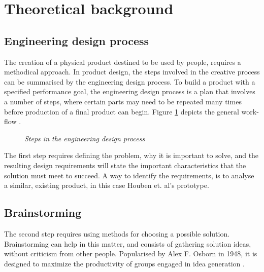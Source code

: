 \section{Theoretical background}
\subsection{Engineering design process}

The creation of a physical product destined to be used by people, requires a methodical approach. In product design, the steps involved in the creative process can be summarised by the engineering design process. To build a product with a specified performance goal, the engineering design process is a plan that involves a number of steps, where certain parts may need to be repeated many times before production of a final product can begin. Figure \ref{fig:eng-design-process} depicts the general work-flow \cite{nasa}.

\begin{figure}[h]
\begin{center}
\caption{\small {\it {Steps in the engineering design process}}} \label{fig:eng-design-process}
\end{center}
\end{figure}

The first step requires defining the problem, why it is important to solve, and the resulting design requirements will state the important characteristics that the solution must meet to succeed. A way to identify the requirements, is to analyse a similar, existing product, in this case Houben et. al's prototype. \\

\subsection{Brainstorming}

The second step requires using methods for choosing a possible solution. Brainstorming can help in this matter, and consists of gathering solution ideas, without criticism from other people. Popularised by Alex F. Osborn in 1948, it is designed to maximize the productivity of groups engaged in idea generation \cite{osborn1948your}. \\

